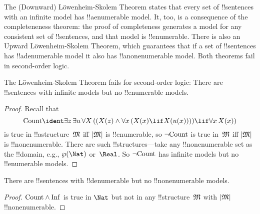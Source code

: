 \documentclass[../../../include/open-logic-section]{subfiles}
\begin{document}


\begin{explain}
The (Downward) L\"owenheim-Skolem Theorem states that every set of
!!{sentence}s with an infinite model has !!a{enumerable} model.  It,
too, is a consequence of the completeneness theorem: the proof of
completeness generates a model for any consistent set of
!!{sentence}s, and that model is !!{enumerable}.  There is also an
Upward L\"owenheim-Skolem Theorem, which guarantees that if a set of
!!{sentence}s has !!a{denumerable} model it also has
!!a{nonenumerable} model.  Both theorems fail in second-order logic.
\end{explain}


\begin{thm}
 The L\"owenheim-Skolem Theorem fails for
second-order logic: There are !!{sentence}s with infinite models but
no !!{enumerable} models.
\end{thm}

\begin{proof}
Recall that 
\[
\fn{Count} \ident \lexists[z][\lexists[u][\lforall[X][((X(z) \land
      \lforall[x][(X(x) \lif X(u(x)))]) \lif \lforall[x][X(x)])]]]
\]
is true in !!a{structure}~$\Struct{M}$ iff $\Domain{M}$ is
!!{enumerable}, so $\lnot\mathrm{Count}$ is true in~$\Struct{M}$
iff $\Domain{M}$ is !!{nonenumerable}.  There are
such !!{structure}s---take any !!{nonenumerable} set as the
!!{domain}, e.g., $\Pow{\Nat}$ or~$\Real$. So $\lnot \mathrm{Count}$ 
has infinite models but no !!{enumerable} models.
\end{proof}

\begin{thm}
There are !!{sentence}s with !!{denumerable} but no
!!{nonenumerable} models.
\end{thm}

\begin{proof}
$\mathrm{Count} \land \mathrm{Inf}$ is true in $\Nat$ but not in any
  !!{structure}~$\Struct{M}$ with $\Domain{M}$ !!{nonenumerable}.
\end{proof}
\end{document}
